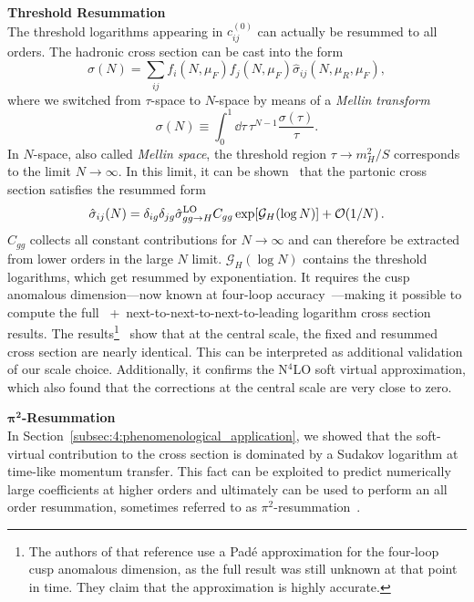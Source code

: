 \textbf{Threshold Resummation}\\
The threshold logarithms appearing in $c_{ij}^{(0)}$ can actually be resummed to all orders. The hadronic cross section can be cast into the form
\begin{equation}
\sigma (N) = \sum_{ij} f_i(N, \mu_F) f_j(N, \mu_F) \hat{\sigma}_{ij}(N, \mu_R, \mu_F),
\end{equation}
where we switched from $\tau$-space to $N$-space by means of a \textit{Mellin transform}
\begin{equation}
\sigma (N) \equiv \int_0^1 \dd \tau \, \tau^{N - 1} \frac{\sigma (\tau)}{\tau}.
\end{equation}
In $N$-space, also called \textit{Mellin space}, the threshold region $\tau \rightarrow m_H^2/S$ corresponds to the limit $N \rightarrow \infty$. In this limit, it can be shown~\cite{Catani:2003zt, Sterman:1986aj, Catani:1989ne, Catani:1990rp} that the partonic cross section satisfies the resummed form
\begin{equation}
\hat{\sigma}_{ij}(N) = \delta_{ig} \delta_{jg} \hat{\sigma}_{gg \rightarrow H}^{\mathrm{LO}} C_{gg} \exp\!\left[ \mathcal{G}_H(\log N) \right] + \mathcal{O}\!\left(1/N\right).
\end{equation}
$C_{gg}$ collects all constant contributions for $N \rightarrow \infty$ and can therefore be extracted from lower orders in the large $N$ limit. $\mathcal{G}_H(\log N)$ contains the threshold logarithms, which get resummed by exponentiation. It requires the cusp anomalous dimension---now known at four-loop accuracy~\cite{vonManteuffel:2020vjv}---making it possible to compute the full \NNNLO\ +\ next-to-next-to-next-to-leading logarithm cross section results. The results\footnote{The authors of that reference use a Pad\'e approximation for the four-loop cusp anomalous dimension, as the full result was still unknown at that point in time. They claim that the approximation is highly accurate.}~\cite{Anastasiou:2016cez} show that at the central scale, the fixed and resummed cross section are nearly identical. This can be interpreted as additional validation of our scale choice. Additionally, it confirms the N${}^4$LO soft virtual approximation, which also found that the corrections at the central scale are very close to zero.

$\mathbf{\pi^2}$\textbf{-Resummation}\\
In Section~\ref{subsec:4:phenomenological_application}, we showed that the soft-virtual contribution to the cross section is dominated by a Sudakov logarithm at time-like momentum transfer. This fact can be exploited to predict numerically large coefficients at higher orders and ultimately can be used to perform an all order resummation, sometimes referred to as $\pi^2$-resummation~\cite{Ahrens:2008qu}.

